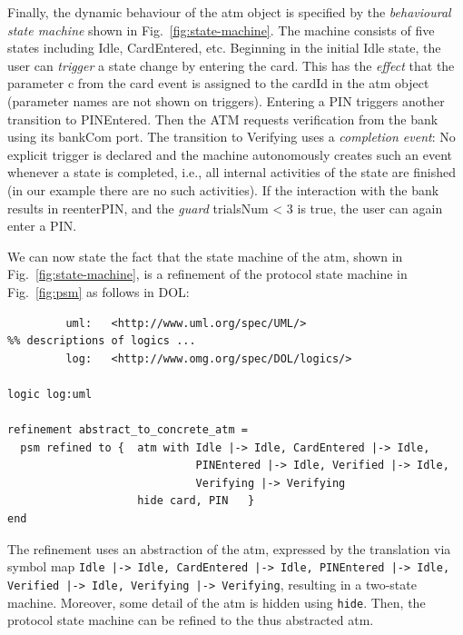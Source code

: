 \documentclass[10pt,fleqn,%
\ifpretendfinal
final%
\else
draft%
\fi,
]{scrreprt}
\newcommand*{\syntax}[1]{\texttt{#1}}
\newcommand{\uml}[1]{\textsf{#1}}
\begin{document}
Finally, the dynamic behaviour of the \uml{atm} object is specified by
the \emph{behavioural state machine} shown in
Fig.~\ref{fig:state-machine}. The machine consists of five states
including \uml{Idle}, \uml{CardEntered}, etc.  Beginning in the
initial \uml{Idle} state, the user can \emph{trigger} a state change
by entering the \uml{card}. This has the \emph{effect} that the
parameter \uml{c} from the \uml{card} event is assigned to the
\uml{cardId} in the \uml{atm} object (parameter names are not shown on
triggers). Entering a \uml{PIN} triggers another transition to
\uml{PINEntered}.  Then the ATM requests verification from the bank
using its \uml{bankCom} port.  The transition to \uml{Verifying} uses
a \emph{completion event}: No explicit trigger is declared and the
machine autonomously creates such an event whenever a state is
completed, i.e., all internal activities of the state are finished (in
our example there are no such activities).  If the interaction with
the bank results in \uml{reenterPIN}, and the \emph{guard}
\uml{trialsNum < 3} is true, the user can again enter a \uml{PIN}.

We can now state the fact that the state machine of the
\uml{atm}, shown in Fig.~\ref{fig:state-machine}, is a refinement of
the protocol state machine in Fig.~\ref{fig:psm} as follows in DOL:

\begin{lstlisting}[basicstyle=\ttfamily,language=dolText,morekeywords={props,ObjectProperty,Class,DisjointUnionOf,SubClassOf,Characteristics,Transitive,Asymmetric,SubPropertyOf,DisjointClasses,EquivalentTo,inverse,only,forall,iff,if,or,exists,bridge,distributed,refinement},escapechar=@,mathescape]
%prefix( :     <http://www.example.org/uml#>
         uml:   <http://www.uml.org/spec/UML/>
%% descriptions of logics ...		 
         log:   <http://www.omg.org/spec/DOL/logics/>

logic log:uml

refinement abstract_to_concrete_atm =
  psm refined to {  atm with Idle |-> Idle, CardEntered |-> Idle, 
                             PINEntered |-> Idle, Verified |-> Idle, 
                             Verifying |-> Verifying 
                    hide card, PIN   }
end
\end{lstlisting}

The refinement uses an abstraction of the \uml{atm}, expressed by the
translation via symbol map \texttt{Idle |-> Idle, CardEntered |-> Idle, PINEntered |-> Idle, Verified |-> Idle, Verifying |-> Verifying}, resulting in a two-state machine. Moreover, some detail of the \uml{atm} is hidden using
\syntax{hide}. Then, the protocol state machine can be refined to
the thus abstracted \uml{atm}.
\end{document}
